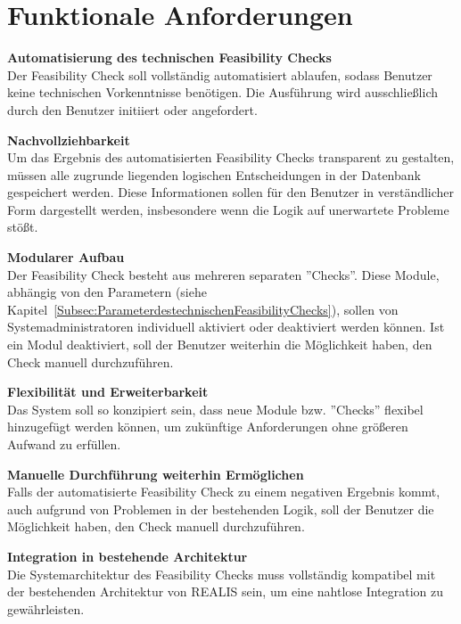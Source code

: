 \section{Funktionale Anforderungen}

\setlength{\leftskip}{1em} 
\textbf{Automatisierung des technischen Feasibility Checks}  \\
Der Feasibility Check soll vollständig automatisiert ablaufen, sodass Benutzer keine technischen Vorkenntnisse benötigen. Die Ausführung wird ausschließlich durch den Benutzer initiiert oder angefordert.

\textbf{Nachvollziehbarkeit}  \\
Um das Ergebnis des automatisierten Feasibility Checks transparent zu gestalten, müssen alle zugrunde liegenden logischen Entscheidungen in der Datenbank gespeichert werden. Diese Informationen sollen für den Benutzer in verständlicher Form dargestellt werden, insbesondere wenn die Logik auf unerwartete Probleme stößt.

\textbf{Modularer Aufbau}  \\
Der Feasibility Check besteht aus mehreren separaten ''Checks''. Diese Module, abhängig von den Parametern (siehe Kapitel~\ref{Subsec:ParameterdestechnischenFeasibilityChecks}), sollen von Systemadministratoren individuell aktiviert oder deaktiviert werden können. Ist ein Modul deaktiviert, soll der Benutzer weiterhin die Möglichkeit haben, den Check manuell durchzuführen.

\textbf{Flexibilität und Erweiterbarkeit}  \\
Das System soll so konzipiert sein, dass neue Module bzw. ''Checks'' flexibel hinzugefügt werden können, um zukünftige Anforderungen ohne größeren Aufwand zu erfüllen.

\textbf{Manuelle Durchführung weiterhin Ermöglichen}  \\
Falls der automatisierte Feasibility Check zu einem negativen Ergebnis kommt, auch aufgrund von Problemen in der bestehenden Logik, soll der Benutzer die Möglichkeit haben, den Check manuell durchzuführen.

\textbf{Integration in bestehende Architektur}  \\
Die Systemarchitektur des Feasibility Checks muss vollständig kompatibel mit der bestehenden Architektur von \gls{REALIS} sein, um eine nahtlose Integration zu gewährleisten.

\setlength{\leftskip}{0em} 
